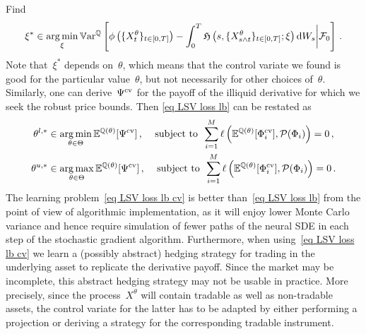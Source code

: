 Find  
\begin{equation}\label{eq loss cv}
\xi^{\ast} \in \operatorname*{arg\,min}_{\xi} \mathbb{V}\mathrm{ar}^{\mathbb{Q}}\left[\phi\left(\{X^{\theta}_t\}_{t\in[0,T]}\right) -  \int_0^T \mathfrak{H}\left(s,\{X^{\theta}_{s\wedge t}\}_{t\in[0,T]};\xi\right) \mathrm{d} W_s \bigg | \mathcal{F}_0\right]\,.
\end{equation}
Note that~$\xi^\ast$ depends on~$\theta$, which means that the control variate we found is good for the particular value~$\theta$, but not necessarily for other choices of~$\theta$. 
Similarly, one can derive~$\Psi^{\textup{cv}}$ for the payoff of the  illiquid derivative for which we seek 
the robust price bounds.  Then \eqref{eq LSV loss lb} can be restated as 
\begin{equation}\label{eq LSV loss lb cv}
\begin{split}
	 \theta^{l,\ast} & \in \operatorname*{arg\,min}_{\theta \in \Theta} \mathbb{E}^{\mathbb{Q}(\theta)}[\Psi^{\textup{cv}}]\,,\,\,\,~\text{ subject to}\,\,\, \sum_{i=1}^M \ell\left(\mathbb{E}^{\mathbb{Q}(\theta)}[\Phi_i^{\textup{cv}}], \mathcal{P}(\Phi_i)\right) = 0\,, \\
\theta^{u,\ast} & \in \operatorname*{arg\,max}_{\theta \in \Theta} \mathbb{E}^{\mathbb{Q}(\theta)}[\Psi^{\textup{cv}}]\,,\,\,\,~\text{ subject to}\,\,\, \sum_{i=1}^M \ell\left(\mathbb{E}^{\mathbb{Q}(\theta)}[\Phi_i^{\textup{cv}}], \mathcal{P}(\Phi_i)\right) = 0\,. 
\end{split}	
\end{equation}
The learning problem~\eqref{eq LSV loss lb cv} is better  than~\eqref{eq LSV loss lb} from the point of view of algorithmic implementation, as it will enjoy lower Monte Carlo variance and hence require simulation of fewer paths of the neural SDE in each step of the stochastic gradient algorithm. 
Furthermore, when using~\eqref{eq LSV loss lb cv} we learn a (possibly abstract)
hedging strategy for trading in the underlying asset 
to replicate the derivative payoff. 
Since the market may be incomplete, this abstract hedging strategy may not be usable in practice. 
More precisely, since the process~$X^\theta$ will contain tradable as well as non-tradable assets, the control variate for the latter has to be adapted by either performing a projection or deriving a strategy for the corresponding tradable instrument.

